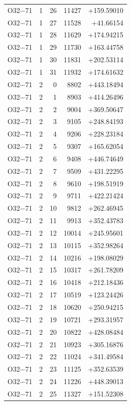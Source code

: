 \documentclass[journal,onecolumn,10pt]{IEEEtran}
\begin{document}
\begin{longtable}{llrrr}
O32$-$71 & 1 & 26 & 11427 & +159.59010 \\
O32$-$71 & 1 & 27 & 11528 & +41.66154 \\
O32$-$71 & 1 & 28 & 11629 & +174.94215 \\
O32$-$71 & 1 & 29 & 11730 & +163.44758 \\
O32$-$71 & 1 & 30 & 11831 & +202.53114 \\
O32$-$71 & 1 & 31 & 11932 & +174.61632 \\
O32$-$71 & 2 & 0 & 8802 & +443.18494 \\
O32$-$71 & 2 & 1 & 8903 & +414.26496 \\
O32$-$71 & 2 & 2 & 9004 & +369.50647 \\
O32$-$71 & 2 & 3 & 9105 & +248.84193 \\
O32$-$71 & 2 & 4 & 9206 & +228.23184 \\
O32$-$71 & 2 & 5 & 9307 & +165.62054 \\
O32$-$71 & 2 & 6 & 9408 & +446.74649 \\
O32$-$71 & 2 & 7 & 9509 & +431.22295 \\
O32$-$71 & 2 & 8 & 9610 & +198.51919 \\
O32$-$71 & 2 & 9 & 9711 & +422.21424 \\
O32$-$71 & 2 & 10 & 9812 & +262.46945 \\
O32$-$71 & 2 & 11 & 9913 & +352.43783 \\
O32$-$71 & 2 & 12 & 10014 & +245.95601 \\
O32$-$71 & 2 & 13 & 10115 & +352.98264 \\
O32$-$71 & 2 & 14 & 10216 & +198.08029 \\
O32$-$71 & 2 & 15 & 10317 & +261.78209 \\
O32$-$71 & 2 & 16 & 10418 & +212.18436 \\
O32$-$71 & 2 & 17 & 10519 & +123.24426 \\
O32$-$71 & 2 & 18 & 10620 & +250.94215 \\
O32$-$71 & 2 & 19 & 10721 & +293.31957 \\
O32$-$71 & 2 & 20 & 10822 & +428.08484 \\
O32$-$71 & 2 & 21 & 10923 & +305.16876 \\
O32$-$71 & 2 & 22 & 11024 & +341.49584 \\
O32$-$71 & 2 & 23 & 11125 & +352.63539 \\
O32$-$71 & 2 & 24 & 11226 & +448.39013 \\
O32$-$71 & 2 & 25 & 11327 & +151.52308 \\

\end{longtable}
\end{document}
